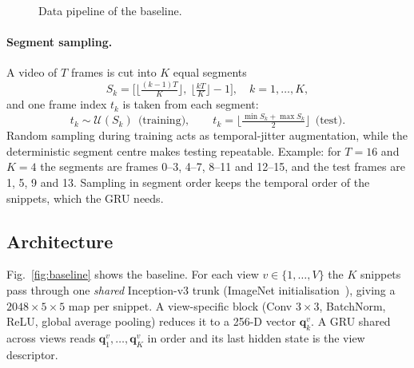 \documentclass[runningheads]{llncs}
\begin{document}
\begin{figure}[t]
\centering
{}
\caption{Data pipeline of the baseline.}\label{fig:pipeline}
\end{figure}

\paragraph{Segment sampling.}
A video of $T$ frames is cut into $K$ equal segments
\begin{equation}
S_k=\Big[\Big\lfloor\tfrac{(k-1)T}{K}\Big\rfloor,\ \Big\lfloor\tfrac{kT}{K}\Big\rfloor-1\Big],\quad k=1,\dots,K,
\end{equation}
and one frame index $t_k$ is taken from each segment:
\begin{equation}
t_k\sim\mathcal{U}(S_k)\ \ \text{(training)},\qquad t_k=\Big\lfloor\tfrac{\min S_k+\max S_k}{2}\Big\rfloor\ \ \text{(test)}.
\end{equation}
Random sampling during training acts as temporal-jitter augmentation, while the deterministic segment centre makes testing repeatable. Example: for $T=16$ and $K=4$ the segments are frames 0--3, 4--7, 8--11 and 12--15, and the test frames are 1, 5, 9 and 13. Sampling in segment order keeps the temporal order of the snippets, which the GRU needs.

\subsection{Architecture}
Fig.~\ref{fig:baseline} shows the baseline. For each view $v\in\{1,\dots,V\}$ the $K$ snippets pass through one \emph{shared} Inception-v3 trunk (ImageNet initialisation~\cite{szegedy2016}), giving a $2048{\times}5{\times}5$ map per snippet. A view-specific block (Conv $3{\times}3$, BatchNorm, ReLU, global average pooling) reduces it to a 256-D vector $\mathbf q^{v}_k$. A GRU shared across views reads $\mathbf q^{v}_1,\dots,\mathbf q^{v}_K$ in order and its last hidden state is the view descriptor.
\end{document}
